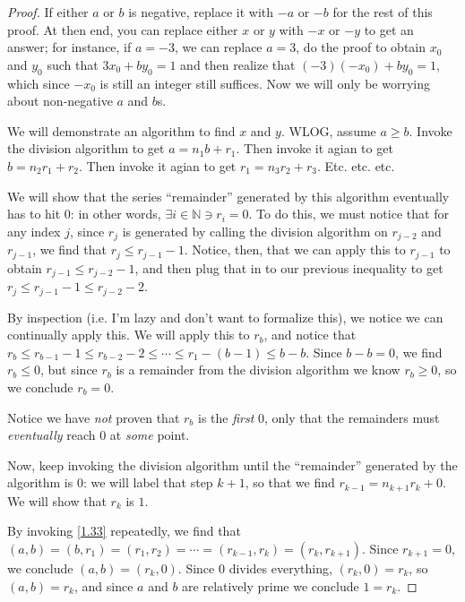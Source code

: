 \documentclass{article}
\numberwithin{equation}{thm}
\begin{document}
\begin{proof}
  If either $a$ or $b$ is negative, replace it with $-a$ or $-b$ for the rest of this proof. At then end, you can replace either $x$ or $y$ with $-x$ or $-y$ to get an answer; for instance, if $a = -3$, we can replace $a = 3$, do the proof to obtain $x_0$ and $y_0$ such that $3x_0 + by_0 = 1$ and then realize that $(-3)(-x_0) + by_0 = 1$, which since $-x_0$ is still an integer still suffices. Now we will only be worrying about non-negative $a$ and $b$s.

  We will demonstrate an algorithm to find $x$ and $y$. WLOG, assume $a \geq b$. Invoke the division algorithm to get $a = n_1 b + r_1$. Then invoke it agian to get $b = n_2 r_1 + r_2$. Then invoke it agian to get $r_1 = n_3 r_2 + r_3$. Etc. etc. etc.

  We will show that the series ``remainder'' generated by this algorithm eventually has to hit $0$: in other words, $\exists i \in \mathbb{N} \ni r_i = 0$. To do this, we must notice that for any index $j$, since $r_j$ is generated by calling the division algorithm on $r_{j-2}$ and $r_{j-1}$, we find that $r_j \leq r_{j-1}-1$.
  Notice, then, that we can apply this to $r_{j-1}$ to obtain $r_{j-1} \leq r_{j-2} - 1$, and then plug that in to our previous inequality to get $r_{j} \leq r_{j-1} - 1 \leq r_{j-2} - 2$.

  By inspection (i.e. I'm lazy and don't want to formalize this), we notice we can continually apply this. We will apply this to $r_b$, and notice that $r_b \leq r_{b-1} - 1 \leq r_{b-2} - 2 \leq \cdots \leq r_{1} - (b - 1) \leq b - b$. Since $b-b = 0$, we find $r_b \leq 0$, but since $r_b$ is a remainder from the division algorithm we know $r_b \geq 0$, so we conclude $r_b = 0$.

  Notice we have \emph{not} proven that $r_b$ is the \emph{first} $0$, only that the remainders must \emph{eventually} reach $0$ at \emph{some} point.

  Now, keep invoking the division algorithm until the ``remainder'' generated by the algorithm is $0$: we will label that step $k+1$, so that we find $r_{k-1} = n_{k+1} r_k + 0$. We will show that $r_k$ is $1$.

  By invoking \ref{1.33} repeatedly, we find that $(a, b) = (b, r_1) = (r_1, r_2) = \cdots = (r_{k-1}, r_k) = (r_k, r_{k+1})$. Since $r_{k+1} = 0$, we conclude $(a, b) = (r_k, 0)$. Since $0$ divides everything, $(r_k, 0) = r_k$, so $(a, b) = r_k$, and since $a$ and $b$ are relatively prime we conclude $1 = r_k$.


\end{proof}
\end{document}
